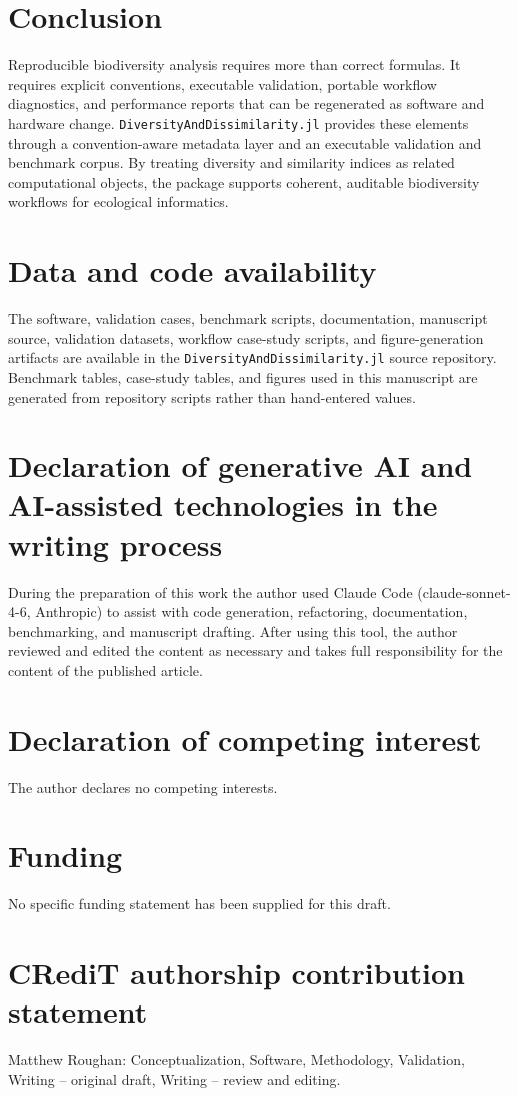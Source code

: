 \documentclass[preprint,12pt,authoryear]{elsarticle}
\begin{document}
\section{Conclusion}

Reproducible biodiversity analysis requires more than correct formulas.
It requires explicit conventions, executable validation, portable workflow
diagnostics, and performance reports that can be regenerated as software and
hardware change.  \texttt{DiversityAndDissimilarity.jl} provides these elements through
a convention-aware metadata layer and an executable validation and benchmark
corpus.  By treating diversity and similarity indices as related computational
objects, the package supports coherent, auditable biodiversity workflows for
ecological informatics.

\section*{Data and code availability}

The software, validation cases, benchmark scripts, documentation, manuscript
source, validation datasets, workflow case-study scripts, and
figure-generation artifacts are available in the \texttt{DiversityAndDissimilarity.jl}
source repository.  Benchmark tables, case-study tables, and figures used in
this manuscript are generated from repository scripts rather than hand-entered
values.

\section*{Declaration of generative AI and AI-assisted technologies in the writing process}

During the preparation of this work the author used Claude Code
(claude-sonnet-4-6, Anthropic) to assist with code generation, refactoring,
documentation, benchmarking, and manuscript drafting. After using this tool,
the author reviewed and edited the content as necessary and takes full
responsibility for the content of the published article.

\section*{Declaration of competing interest}

The author declares no competing interests.

\section*{Funding}

No specific funding statement has been supplied for this draft.

\section*{CRediT authorship contribution statement}

Matthew Roughan: Conceptualization, Software, Methodology, Validation,
Writing -- original draft, Writing -- review and editing.



\end{document}
